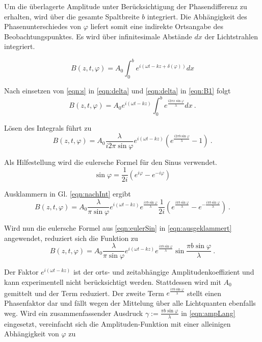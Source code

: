 Um die überlagerte Amplitude unter Berücksichtigung der Phasendifferenz zu erhalten, wird über die gesamte Spaltbreite $b$ integriert.
Die Abhängigkeit des Phasenunterschiedes von $\varphi$ liefert somit eine indirekte Ortsangabe des Beobachtungspunktes.
Es wird über infinitesimale Abstände $dx$ der Lichtstrahlen integriert.

\begin{equation}
  B(z, t, \varphi) = A_0\int_0^be^{i(\omega t - kz + \delta(\varphi))}dx
  \label{eqn:B1}
\end{equation}

Nach einsetzen von \eqref{eqn:s} in \eqref{eqn:delta} und \eqref{eqn:delta} in \eqref{eqn:B1} folgt
\begin{equation*}
  B(z, t, \varphi) = A_0e^{i(\omega t - kz)}\int_0^be^{\frac{i2\pi x \sin{\varphi}}{\lambda}}dx \:.
\end{equation*}

Lösen des Integrals führt zu
\begin{equation}
  B(z, t, \varphi) = A_0\frac{\lambda}{i2\pi \sin{\varphi}}e^{i(\omega t - kz)}(e^{\frac{i2\pi b \sin{\varphi}}{\lambda}}-1) \:.
  \label{eqn:nachInt}
\end{equation}

Als Hilfestellung wird die eulersche Formel für den Sinus verwendet.
\begin{equation}
  \sin{\varphi} = \frac{1}{2i}(e^{i\varphi}-e^{-i\varphi})
  \label{eqn:eulerSin}
\end{equation}

Ausklammern in Gl. \eqref{eqn:nachInt} ergibt
\begin{equation}
  B(z, t, \varphi) = A_0\frac{\lambda}{\pi \sin{\varphi}}e^{i(\omega t - kz)}e^{\frac{i\pi b \sin{\varphi}}{\lambda}}\frac{1}{2i}(e^{\frac{i\pi b \sin{\varphi}}{\lambda}}-e^{-\frac{i\pi b \sin{\varphi}}{\lambda}}) \:.
  \label{eqn:ausgeklammert}
\end{equation}

Wird nun die eulersche Formel aus \eqref{eqn:eulerSin} in \eqref{eqn:ausgeklammert} angewendet, reduziert sich die Funktion zu
\begin{equation}
  B(z, t, \varphi) = A_0\frac{\lambda}{\pi \sin{\varphi}}e^{i(\omega t - kz)}e^{\frac{i\pi b \sin{\varphi}}{\lambda}}\sin{\frac{\pi b \sin{\varphi}}{\lambda}} \:.
  \label{eqn:ampLang}
\end{equation}

Der Faktor $e^{i(\omega t - kz)}$ ist der orts- und zeitabhängige Amplitudenkoeffizient und kann experimentell nicht berücksichtigt werden. Stattdessen wird mit $A_0$ gemittelt
und der Term reduziert.
Der zweite Term $e^{\frac{i\pi b \sin{\varphi}}{\lambda}}$ stellt einen Phasenfaktor dar und fällt wegen der Mittelung über alle Lichtquanten ebenfalls weg.
Wird ein zusammenfassender Ausdruck $\gamma := \frac{\pi b \sin{\varphi}}{\lambda}$ in \eqref{eqn:ampLang} eingesetzt, vereinfacht sich die Amplituden-Funktion mit einer alleinigen Abhängigkeit von $\varphi$ zu


